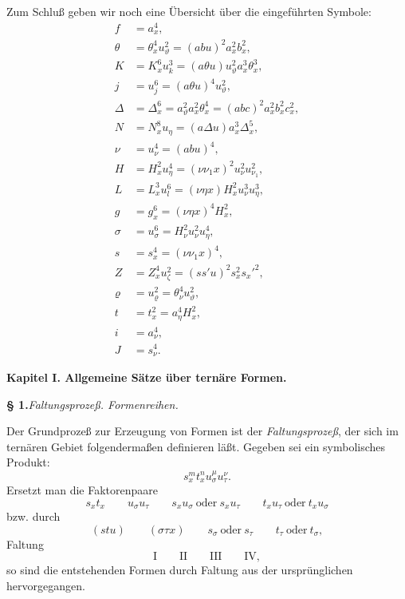 Zum Schluß geben wir noch eine Übersicht über die eingeführten Symbole:
\begin{align*}
f&=a_x^4,\\
\theta&=\theta_x^4u_\vartheta^2=(abu)^2a_x^2b_x^2,\\
K&=K_x^6u_k^3=(a\theta u)u_\vartheta^2a_x^3\theta_x^3,\\
j&=u_j^6=(a\theta u)^4u_\vartheta^2,\\
\Delta&=\Delta_x^6=a_\vartheta^2a_x^2\theta_x^4=(abc)^2a_x^2b_x^2c_x^2,\\
N&=N_x^8u_\eta=(a\Delta u)a_x^3\Delta_x^5,\\
\nu&=u_\nu^4=(abu)^4,\\
H&=H_x^2u_\eta^4=(\nu\nu_1x)^2u_\nu^2u_{\nu_1}^2,\\
L&=L_x^3u_l^6=(\nu\eta x)H_x^2u_\nu^3u_\eta^3,\\
g&=g_x^6=(\nu\eta x)^4H_x^2,\\
\sigma&=u_\sigma^6=H_\nu^2u_\nu^2u_\eta^4,\\
s&=s_x^4=(\nu\nu_1x)^4,\\
Z&=Z_x^4u_\zeta^2=(ss'u)^2s_x^2s_x'^2,\\
\varrho&=u_\varrho^2=\theta_\nu^4u_\vartheta^2,\\
t&=t_x^2=a_\eta^4H_x^2,\\
i&=a_\nu^4,\\
J&=s_\nu^4.
\end{align*}

\begin{center}
{\Large\bfseries Kapitel I. \quad Allgemeine Sätze über ternäre Formen.}
\end{center}

\begin{center}
\textbf{§ 1.}\quad \emph{Faltungsprozeß. Formenreihen.}
\end{center}

Der Grundprozeß zur Erzeugung von Formen ist der \emph{Faltungsprozeß}, der sich im ternären Gebiet folgendermaßen definieren läßt. Gegeben sei ein symbolisches Produkt:
\[
s_x^m t_x^n u_\sigma^\mu u_\tau^\nu .
\]
Ersetzt man die Faktorenpaare
\[
s_xt_x\qquad u_\sigma u_\tau\qquad s_xu_\sigma\ \text{oder}\ s_xu_\tau
\qquad t_xu_\tau\ \text{oder}\ t_xu_\sigma
\]
bzw. durch
\[
(stu)\qquad (\sigma\tau x)\qquad s_\sigma\ \text{oder}\ s_\tau
\qquad t_\tau\ \text{oder}\ t_\sigma,
\]
Faltung
\[
\text{I}\qquad\text{II}\qquad\text{III}\qquad\text{IV},
\]
so sind die entstehenden Formen durch Faltung aus der ursprünglichen hervorgegangen.

